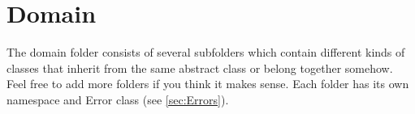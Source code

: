 \section{Domain}

The domain folder consists of several subfolders which contain different kinds of classes that inherit from the same abstract class or belong together somehow. Feel free to add more folders if you think it makes sense. Each folder has its own namespace and Error class (see \ref{sec:Errors}).





